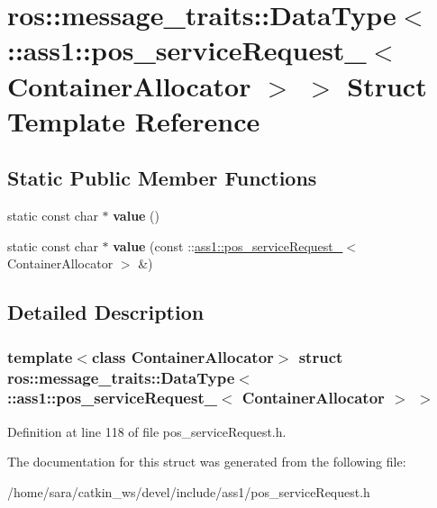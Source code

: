 \hypertarget{structros_1_1message__traits_1_1DataType_3_01_1_1ass1_1_1pos__serviceRequest___3_01ContainerAllocator_01_4_01_4}{}\section{ros\+:\+:message\+\_\+traits\+:\+:Data\+Type$<$ \+:\+:ass1\+:\+:pos\+\_\+service\+Request\+\_\+$<$ Container\+Allocator $>$ $>$ Struct Template Reference}
\label{structros_1_1message__traits_1_1DataType_3_01_1_1ass1_1_1pos__serviceRequest___3_01ContainerAllocator_01_4_01_4}
\subsection*{Static Public Member Functions}
\begin{DoxyCompactItemize}
\item 
\mbox{\label{structros_1_1message__traits_1_1DataType_3_01_1_1ass1_1_1pos__serviceRequest___3_01ContainerAllocator_01_4_01_4_ab1e7c7781e6c759e61ac52c1af1e435f}} 
static const char $\ast$ {\bfseries value} ()
\item 
\mbox{\label{structros_1_1message__traits_1_1DataType_3_01_1_1ass1_1_1pos__serviceRequest___3_01ContainerAllocator_01_4_01_4_a72bcc02856697b10b9ad948e4f8a92f7}} 
static const char $\ast$ {\bfseries value} (const \+::\hyperlink{structass1_1_1pos__serviceRequest__}{ass1\+::pos\+\_\+service\+Request\+\_\+}$<$ Container\+Allocator $>$ \&)
\end{DoxyCompactItemize}


\subsection{Detailed Description}
\subsubsection*{template$<$class Container\+Allocator$>$\newline
struct ros\+::message\+\_\+traits\+::\+Data\+Type$<$ \+::ass1\+::pos\+\_\+service\+Request\+\_\+$<$ Container\+Allocator $>$ $>$}



Definition at line 118 of file pos\+\_\+service\+Request.\+h.



The documentation for this struct was generated from the following file\+:\begin{DoxyCompactItemize}
\item 
/home/sara/catkin\+\_\+ws/devel/include/ass1/pos\+\_\+service\+Request.\+h\end{DoxyCompactItemize}
